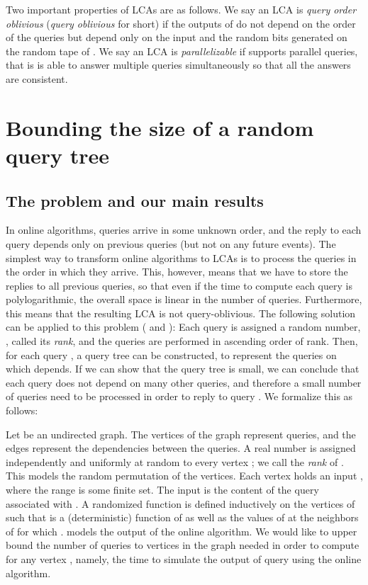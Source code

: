 \documentclass[english, oribibl]{llncs}
\begin{document}
Two important properties of LCAs are as follows.
We say an LCA  is \emph{query order oblivious} (\emph{query oblivious} for short)
if the outputs of  do not depend on the order of the queries but
depend only on the input and the random bits generated on the random tape of .
We say an LCA  is \emph{parallelizable} if 
supports parallel queries, that is  is able to answer multiple queries
simultaneously so that all the answers are consistent.



\section{Bounding the size of a random query tree}
\label{section:tree_size}

\subsection{The problem and our main results}\label{Sect:query_tree}

In online algorithms, queries arrive in some unknown order, and the reply to each query depends only on previous queries (but not on any future events). The simplest way to transform online algorithms to LCAs is to process the queries in the order in which they arrive. This, however, means that we have to store the replies to all previous queries, so that even if the time to compute each query is polylogarithmic, the overall space is linear in the number of queries. Furthermore, this means that the resulting LCA is not query-oblivious. The following solution can be applied to this problem (\cite{NO08} and \cite{ARV+11}): Each query  is assigned a random number,  , called its \emph{rank}, and the queries are performed in ascending order of rank. Then, for each query , a query tree can be constructed, to represent the queries on which  depends. If we can show that the query tree is small, we can conclude that each query does not depend on many other queries, and therefore a small number of queries need to be processed in order to reply to query .  We formalize this as follows: 


Let  be an undirected graph. The vertices of the graph represent queries, and the edges represent the dependencies between the queries.
A real number  is assigned independently and uniformly at random to every vertex
; we call  the \emph{rank} of . This models the random permutation of the vertices.
Each vertex   holds an input , where the range  is some finite set. The input is the content of the query associated with .
A randomized function  is defined inductively on the vertices of  such that
 is a (deterministic) function of  as well as the values of  at the neighbors  of 
for which .  models the output of the online algorithm.
We would like to upper bound the number of queries to vertices in the graph needed in order to compute  for any vertex , namely, the time to simulate the output of query  using the online algorithm.
\end{document}
